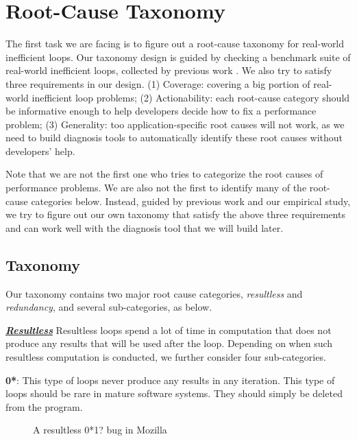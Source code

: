 \section{Root-Cause Taxonomy}
\label{sec:study}

The first task we are facing is to figure out a root-cause taxonomy for
real-world inefficient loops. 
Our taxonomy design is guided by checking a benchmark suite of real-world
inefficient loops, collected by previous work \cite{SongOOPSLA2014,PerfBug}. 
We also try to satisfy three requirements in our design.
(1) Coverage: covering
a big portion of real-world inefficient loop problems; 
(2) Actionability: each root-cause category should be informative enough 
to help developers
decide how to fix a performance problem; 
(3) Generality: too application-specific root causes will not work, as we
need to build diagnosis tools to automatically identify these root causes 
without developers' help.

Note that we are not the first one who tries to categorize
the root causes of performance problems. We are also not the first
to identify many of the root-cause categories below. Instead, guided by
previous work and our empirical study, we try to figure out our own taxonomy 
that satisfy the above three requirements and can
work well with the diagnosis tool that we will build later.

\subsection{Taxonomy}
\label{sec:study_tax}
Our taxonomy contains two major root cause categories,
\textit{resultless} and \textit{redundancy}, and several sub-categories, 
as below.

\underline{\textit{\textbf{Resultless}}}
Resultless loops spend a lot of time in computation that does not 
produce any results that will be used after the loop.
Depending on when such resultless computation is conducted, we further
consider four sub-categories.

{\textbf{0*}}: 
This type of loops never produce any results in any iteration.
This type of loops should be rare in mature software systems.
They should simply be deleted from the program.

\begin{figure}[h]
\centering
{}
  \mbox{}
\caption{A resultless 0*1? bug in Mozilla}
\label{fig:Mozilla347306}
\end{figure}

